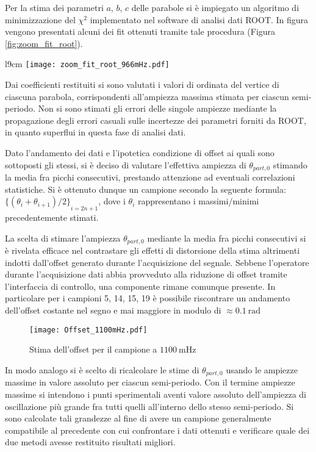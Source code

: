 \documentclass[a4paper,11pt,oneside]{article}
\begin{document}
Per la stima dei parametri $a$, $b$, $c$ delle parabole si è impiegato un algoritmo di minimizzazione del $\chi^{2}$ implementato nel software di analisi dati ROOT. In figura vengono presentati alcuni dei fit ottenuti tramite tale procedura (Figura \ref{fig:zoom_fit_root}).

\begin{wrapfigure}{l}{9cm}
    \texttt{[image: zoom\_fit\_root\_966mHz.pdf]}
    \caption{Esempio interpolazione parabolica}
    \label{fig:zoom_fit_root}
\end{wrapfigure}

Dai coefficienti restituiti si sono valutati i valori di ordinata del vertice di ciascuna parabola, corrispondenti all'ampiezza massima stimata per ciascun semi-periodo. Non si sono stimati gli errori delle singole ampiezze mediante la propagazione degli errori casuali sulle incertezze dei parametri forniti da ROOT, in quanto superflui in questa fase di analisi dati.

Dato l'andamento dei dati e l'ipotetica condizione di offset ai quali sono sottoposti gli stessi, si è deciso di valutare l'effettiva ampiezza di $\theta_{part,0}$ stimando la media fra picchi consecutivi, prestando attenzione ad eventuali correlazioni statistiche. Si è ottenuto dunque un campione secondo la seguente formula: ${\{(\theta_{i}+\theta_{i+1})/2\}}_{i=2n+1}$, dove i  $\theta_{i}$ rappresentano i massimi/minimi precedentemente stimati.

La scelta di stimare l'ampiezza $\theta_{part, 0}$ mediante la media fra picchi consecutivi si è rivelata efficace nel contrastare gli effetti di distorsione della stima altrimenti indotti dall'offset generato durante l'acquisizione del segnale. Sebbene l'operatore durante l'acquisizione dati abbia provveduto alla riduzione di offset tramite l'interfaccia di controllo, una componente rimane comunque presente. In particolare per i campioni 5, 14, 15, 19 è possibile riscontrare un andamento dell'offset costante nel segno e mai maggiore in modulo di $\approx \SI{0,1}{\radian}$\newline

\begin{figure}[h!]
    \centering
    \texttt{[image: Offset\_1100mHz.pdf]}
    \caption{Stima dell'offset per il campione a $\SI{1100}{\milli\hertz}$}
    \label{fig:offset}
\end{figure}
In modo analogo si è scelto di ricalcolare le stime di $\theta_{part, 0}$ usando le ampiezze massime in valore assoluto per ciascun semi-periodo. Con il termine ampiezze massime si intendono i punti sperimentali aventi valore assoluto dell'ampiezza di oscillazione più grande fra tutti quelli all'interno dello stesso semi-periodo. Si sono calcolate tali grandezze al fine di avere un campione generalmente compatibile al precedente con cui confrontare i dati ottenuti e verificare quale dei due metodi avesse restituito risultati migliori.\\
\end{document}
